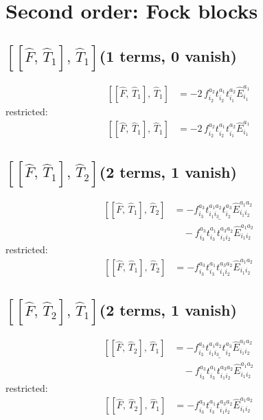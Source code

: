 \documentclass[11pt]{article}
\begin{document}
\section{Second order: Fock blocks}
\subsection*{$\left[\left[\hat{F},\, \hat{T}_{1}\right],\, \hat{T}_{1}\right]$\quad(1 terms, 0 vanish)}
\begin{align}
\left[\left[\hat{F},\, \hat{T}_{1}\right],\, \hat{T}_{1}\right] &= - 2\, f^{a_{2}}_{i_{2}} t^{a_{1}}_{i_{2}} t^{a_{2}}_{i_{1}} \hat{E}^{a_{1}}_{i_{1}}
\end{align}
restricted:
\begin{align}
\left[\left[\hat{F},\, \hat{T}_{1}\right],\, \hat{T}_{1}\right] &= - 2\, f^{a_{2}}_{i_{2}} t^{a_{1}}_{i_{2}} t^{a_{2}}_{i_{1}} \hat{E}^{a_{1}}_{i_{1}}
\end{align}
\subsection*{$\left[\left[\hat{F},\, \hat{T}_{1}\right],\, \hat{T}_{2}\right]$\quad(2 terms, 1 vanish)}
\begin{align}
\left[\left[\hat{F},\, \hat{T}_{1}\right],\, \hat{T}_{2}\right] &= \underline{- f^{a_{3}}_{i_{3}} t^{a_{1}a_{2}}_{i_{1}i_{3}} t^{a_{3}}_{i_{2}} \hat{E}^{a_{1}a_{2}}_{i_{1}i_{2}}} \\
&\quad - f^{a_{3}}_{i_{3}} t^{a_{1}}_{i_{3}} t^{a_{3}a_{2}}_{i_{1}i_{2}} \hat{E}^{a_{1}a_{2}}_{i_{1}i_{2}}
\end{align}
restricted:
\begin{align}
\left[\left[\hat{F},\, \hat{T}_{1}\right],\, \hat{T}_{2}\right] &= - f^{a_{3}}_{i_{3}} t^{a_{1}}_{i_{3}} t^{a_{3}a_{2}}_{i_{1}i_{2}} \hat{E}^{a_{1}a_{2}}_{i_{1}i_{2}}
\end{align}
\subsection*{$\left[\left[\hat{F},\, \hat{T}_{2}\right],\, \hat{T}_{1}\right]$\quad(2 terms, 1 vanish)}
\begin{align}
\left[\left[\hat{F},\, \hat{T}_{2}\right],\, \hat{T}_{1}\right] &= \underline{- f^{a_{3}}_{i_{3}} t^{a_{1}a_{2}}_{i_{1}i_{3}} t^{a_{3}}_{i_{2}} \hat{E}^{a_{1}a_{2}}_{i_{1}i_{2}}} \\
&\quad - f^{a_{3}}_{i_{3}} t^{a_{1}}_{i_{3}} t^{a_{3}a_{2}}_{i_{1}i_{2}} \hat{E}^{a_{1}a_{2}}_{i_{1}i_{2}}
\end{align}
restricted:
\begin{align}
\left[\left[\hat{F},\, \hat{T}_{2}\right],\, \hat{T}_{1}\right] &= - f^{a_{3}}_{i_{3}} t^{a_{1}}_{i_{3}} t^{a_{3}a_{2}}_{i_{1}i_{2}} \hat{E}^{a_{1}a_{2}}_{i_{1}i_{2}}
\end{align}
\end{document}
